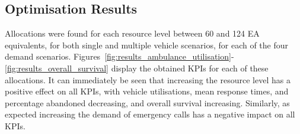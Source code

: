 \documentclass[preprint,12pt]{elsarticle}
\begin{document}



\subsection{Optimisation Results}\label{sec:optimisation_results} Allocations
were found for each resource level between 60 and 124 EA equivalents, for both
single and multiple vehicle scenarios, for each of the four demand scenarios.
Figures~\ref{fig:results_ambulance_utilisation}-\ref{fig:results_overall_survival}
display the obtained KPIs for each of these allocations. It can immediately be
seen that increasing the resource level has a positive effect on all KPIs, with
vehicle utilisations, mean response times, and percentage abandoned decreasing,
and overall survival increasing. Similarly, as expected increasing the demand of
emergency calls has a negative impact on all KPIs.
\end{document}
